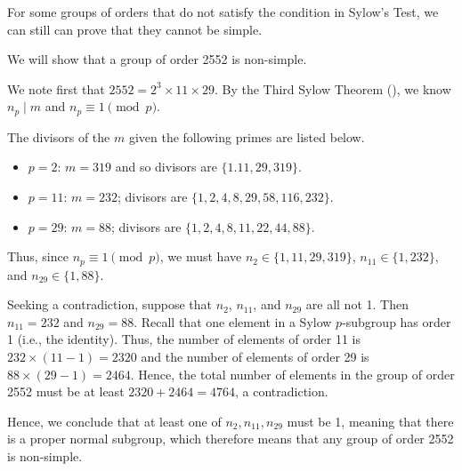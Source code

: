 For some groups of orders that do not satisfy the condition in Sylow's Test, we can still can prove that they cannot be simple.

\newpage

\begin{example}
    We will show that a group of order 2552 is non-simple.

    We note first that $2552 = 2^3 \times 11 \times 29$. By the Third Sylow Theorem (), we know $n_p \mid m$ and $n_p \equiv 1 \pmod p$.

    The divisors of the $m$ given the following primes are listed below.
    \begin{itemize}
        \item $p = 2$: $m = 319$ and so divisors are $\{1. 11, 29, 319\}$.
        \item $p = 11$: $m = 232$; divisors are $\{1, 2, 4, 8, 29, 58, 116, 232\}$.
        \item $p = 29$: $m = 88$; divisors are $\{1, 2, 4, 8, 11, 22, 44, 88\}$.
    \end{itemize}
    Thus, since $n_p \equiv 1 \pmod p$, we must have $n_2 \in \{1, 11, 29, 319\}$, $n_{11} \in \{1, 232\}$, and $n_{29} \in \{1, 88\}$.

    Seeking a contradiction, suppose that $n_2$, $n_{11}$, and $n_{29}$ are all not 1. Then $n_{11} = 232$ and $n_{29} = 88$. Recall that one element in a Sylow $p$-subgroup has order 1 (i.e., the identity). Thus, the number of elements of order 11 is $232 \times (11 - 1) = 2320$ and the number of elements of order 29 is $88 \times (29 - 1) = 2464$. Hence, the total number of elements in the group of order 2552 must be at least $2320 + 2464 = 4764$, a contradiction.

    Hence, we conclude that at least one of $n_2, n_{11}, n_{29}$ must be 1, meaning that there is a proper normal subgroup, which therefore means that any group of order 2552 is non-simple.
\end{example}

